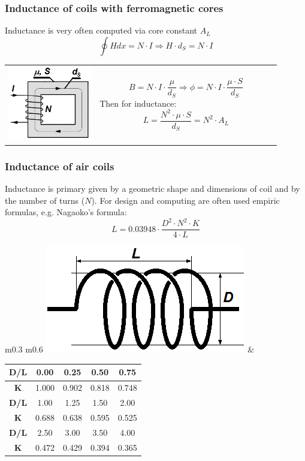 \documentclass{beamer}
\begin{document}
	\begin{frame}
	\frametitle{Inductance of coils with ferromagnetic cores}
	Inductance is very often computed via core constant $A_L$
	$$\oint H dx = N\cdot I \Rightarrow H\cdot d_S = N\cdot I$$
		\begin{tabular}{m{0.3\linewidth} m{0.6\linewidth}}
		\includegraphics[scale=0.48]{obr02_mgObvod.png} & 
		$$B = N\cdot I\cdot \frac{\mu}{d_S}\Rightarrow \phi= N\cdot I\cdot \frac{\mu\cdot S}{d_S}$$
		Then for inductance:
		$$L= \frac{N^2\cdot\mu\cdot S}{d_S} = N^2 \cdot A_L$$
		\end{tabular}
  \end{frame}
	\begin{frame}
	\frametitle{Inductance of air coils}
	Inductance is primary given by a geometric shape and dimensions of coil and by the number of turns ($N$). For design and computing are often used empiric formulas, e.g. Nagaoko's formula:
	$$L= 0.03948\cdot \frac{D^2\cdot N^2\cdot K}{4\cdot L}$$
	\small
		\begin{tabular}{m{0.3\linewidth} m{0.6\linewidth}}
		\includegraphics[scale=0.35]{obr03_vzdInduk.png} & 
		\begin{tabular}{|c|c|c|c|c|}
		\hline
		\textbf{D/L} & 0.00 & 0.25 & 0.50 & 0.75 \\
		\hline
		\textbf{K}   & 1.000 & 0.902 & 0.818 & 0.748 \\
		\hline\hline
		\textbf{D/L} & 1.00 & 1.25 & 1.50 & 2.00 \\
		\hline
		\textbf{K}   & 0.688 & 0.638 & 0.595 & 0.525 \\
		\hline\hline
		\textbf{D/L} & 2.50 & 3.00 & 3.50 & 4.00 \\
		\hline
		\textbf{K}   & 0.472 & 0.429 & 0.394 & 0.365 \\
		\hline
		\end{tabular}
		\end{tabular}
  \end{frame}
\end{document}
